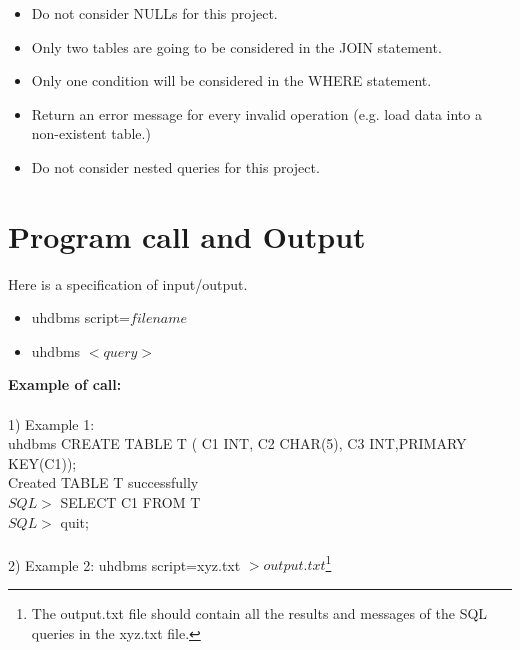 \begin{itemize}
	\item Do not consider NULLs for this project.
	\item Only two tables are going to be considered in the JOIN statement.
	\item Only one condition will be considered in the WHERE statement.
	\item Return an error message for every invalid operation (e.g. load data into a non-existent table.)
	\item	Do not consider nested queries for this project.
\end{itemize}

\section{Program call and Output}

Here is a specification of input/output.

\begin{itemize}
	\item uhdbms script=$filename$
	\item uhdbms $<query>$
\end{itemize}
\textbf{Example of call:} \\
\\
1) Example 1:
\\
uhdbms CREATE TABLE T ( C1 INT, C2 CHAR(5), C3 INT,PRIMARY KEY(C1));
\\
	Created TABLE T successfully
\\
	$SQL>$ SELECT C1 FROM T
\\
	$SQL>$ quit;
\\
\\
2) Example 2:
uhdbms script=xyz.txt $>output.txt$\footnote{The output.txt file should contain all the results and messages of the SQL queries in the xyz.txt file.}


